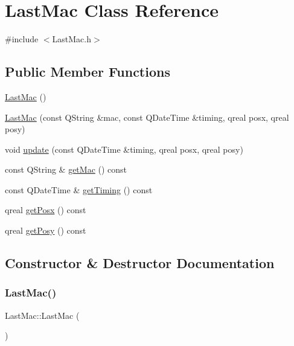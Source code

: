 \hypertarget{class_last_mac}{}\section{Last\+Mac Class Reference}
\label{class_last_mac}


{\ttfamily \#include $<$Last\+Mac.\+h$>$}

\subsection*{Public Member Functions}
\begin{DoxyCompactItemize}
\item 
\hyperlink{class_last_mac_a5ba0c386efac401c1188fdf68d48a0c0}{Last\+Mac} ()
\item 
\hyperlink{class_last_mac_a10da31c93b21b164eabfb3a91dea7bd2}{Last\+Mac} (const Q\+String \&mac, const Q\+Date\+Time \&timing, qreal posx, qreal posy)
\item 
void \hyperlink{class_last_mac_a65b9f0ab0708f58e914edebaf0b24232}{update} (const Q\+Date\+Time \&timing, qreal posx, qreal posy)
\item 
const Q\+String \& \hyperlink{class_last_mac_a334e24e1707bc7abd20c20248d01e80b}{get\+Mac} () const
\item 
const Q\+Date\+Time \& \hyperlink{class_last_mac_aad658ad67a78c517d59627d41685137e}{get\+Timing} () const
\item 
qreal \hyperlink{class_last_mac_a0e1eaeafbd129715fd9b2bfdb6ca1e29}{get\+Posx} () const
\item 
qreal \hyperlink{class_last_mac_a86a580b8a3a7463b739f63d5df5d8b99}{get\+Posy} () const
\end{DoxyCompactItemize}


\subsection{Constructor \& Destructor Documentation}
\mbox{\label{class_last_mac_a5ba0c386efac401c1188fdf68d48a0c0}} 
\subsubsection{\texorpdfstring{Last\+Mac()}{LastMac()}\hspace{0.1cm}{\footnotesize\ttfamily [1/2]}}
{\footnotesize\ttfamily Last\+Mac\+::\+Last\+Mac (\begin{DoxyParamCaption}{ }\end{DoxyParamCaption})}

